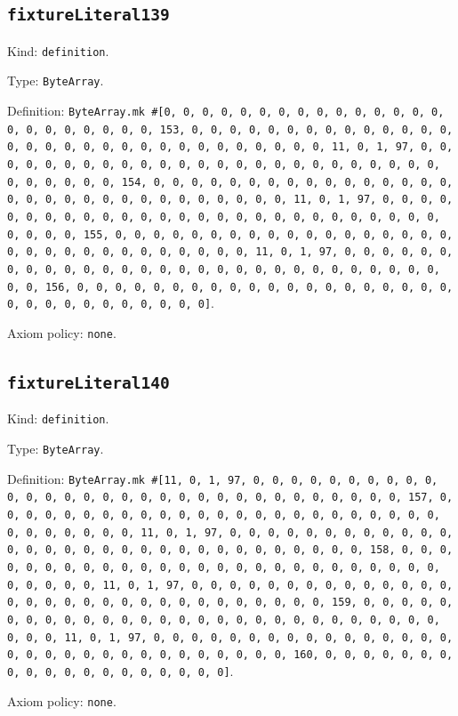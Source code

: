 \documentclass[11pt]{article}
\begin{document}
\subsection*{\texttt{fixtureLiteral139}}
\noindent Kind: \texttt{definition}.\par
\noindent Type: \texttt{ByteArray}.\par
\noindent Definition: \texttt{ByteArray.mk \#[0, 0, 0, 0, 0, 0, 0, 0, 0, 0, 0, 0, 0, 0, 0, 0, 0, 0, 0, 0, 0, 0, 0, 153, 0, 0, 0, 0, 0, 0, 0, 0, 0, 0, 0, 0, 0, 0, 0, 0, 0, 0, 0, 0, 0, 0, 0, 0, 0, 0, 0, 0, 0, 0, 0, 11, 0, 1, 97, 0, 0, 0, 0, 0, 0, 0, 0, 0, 0, 0, 0, 0, 0, 0, 0, 0, 0, 0, 0, 0, 0, 0, 0, 0, 0, 0, 0, 0, 0, 0, 154, 0, 0, 0, 0, 0, 0, 0, 0, 0, 0, 0, 0, 0, 0, 0, 0, 0, 0, 0, 0, 0, 0, 0, 0, 0, 0, 0, 0, 0, 0, 0, 11, 0, 1, 97, 0, 0, 0, 0, 0, 0, 0, 0, 0, 0, 0, 0, 0, 0, 0, 0, 0, 0, 0, 0, 0, 0, 0, 0, 0, 0, 0, 0, 0, 0, 0, 155, 0, 0, 0, 0, 0, 0, 0, 0, 0, 0, 0, 0, 0, 0, 0, 0, 0, 0, 0, 0, 0, 0, 0, 0, 0, 0, 0, 0, 0, 0, 0, 11, 0, 1, 97, 0, 0, 0, 0, 0, 0, 0, 0, 0, 0, 0, 0, 0, 0, 0, 0, 0, 0, 0, 0, 0, 0, 0, 0, 0, 0, 0, 0, 0, 0, 0, 156, 0, 0, 0, 0, 0, 0, 0, 0, 0, 0, 0, 0, 0, 0, 0, 0, 0, 0, 0, 0, 0, 0, 0, 0, 0, 0, 0, 0, 0, 0, 0]}.\par
\noindent Axiom policy: \texttt{none}.\par
\subsection*{\texttt{fixtureLiteral140}}
\noindent Kind: \texttt{definition}.\par
\noindent Type: \texttt{ByteArray}.\par
\noindent Definition: \texttt{ByteArray.mk \#[11, 0, 1, 97, 0, 0, 0, 0, 0, 0, 0, 0, 0, 0, 0, 0, 0, 0, 0, 0, 0, 0, 0, 0, 0, 0, 0, 0, 0, 0, 0, 0, 0, 0, 0, 157, 0, 0, 0, 0, 0, 0, 0, 0, 0, 0, 0, 0, 0, 0, 0, 0, 0, 0, 0, 0, 0, 0, 0, 0, 0, 0, 0, 0, 0, 0, 0, 11, 0, 1, 97, 0, 0, 0, 0, 0, 0, 0, 0, 0, 0, 0, 0, 0, 0, 0, 0, 0, 0, 0, 0, 0, 0, 0, 0, 0, 0, 0, 0, 0, 0, 0, 158, 0, 0, 0, 0, 0, 0, 0, 0, 0, 0, 0, 0, 0, 0, 0, 0, 0, 0, 0, 0, 0, 0, 0, 0, 0, 0, 0, 0, 0, 0, 0, 11, 0, 1, 97, 0, 0, 0, 0, 0, 0, 0, 0, 0, 0, 0, 0, 0, 0, 0, 0, 0, 0, 0, 0, 0, 0, 0, 0, 0, 0, 0, 0, 0, 0, 0, 159, 0, 0, 0, 0, 0, 0, 0, 0, 0, 0, 0, 0, 0, 0, 0, 0, 0, 0, 0, 0, 0, 0, 0, 0, 0, 0, 0, 0, 0, 0, 0, 11, 0, 1, 97, 0, 0, 0, 0, 0, 0, 0, 0, 0, 0, 0, 0, 0, 0, 0, 0, 0, 0, 0, 0, 0, 0, 0, 0, 0, 0, 0, 0, 0, 0, 0, 160, 0, 0, 0, 0, 0, 0, 0, 0, 0, 0, 0, 0, 0, 0, 0, 0, 0, 0, 0]}.\par
\noindent Axiom policy: \texttt{none}.\par
\end{document}
